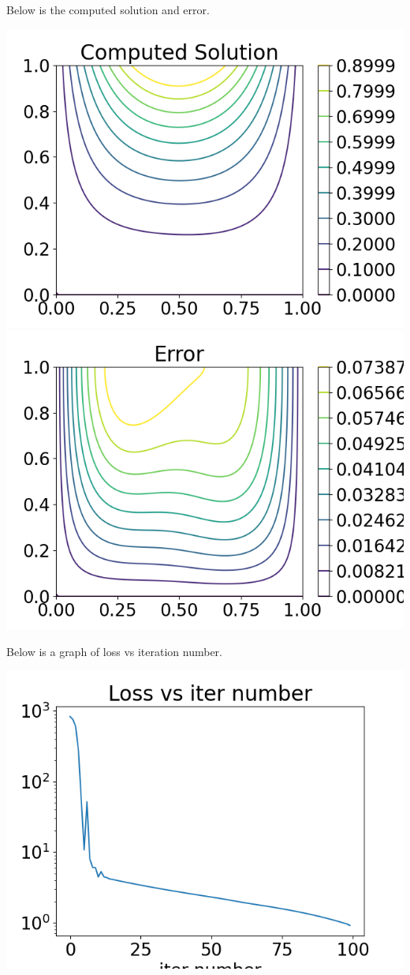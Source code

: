 \documentclass{article}
\begin{document}
Below is the computed solution and error.
\begin{center}
	\includegraphics[scale=.5]{hw9 sol}
	\includegraphics[scale=.5]{hw9 error}
\end{center}
Below is a graph of loss vs iteration number.
\begin{center}
	\includegraphics[scale=.3]{hw9 loss}
\end{center}
\end{document}
